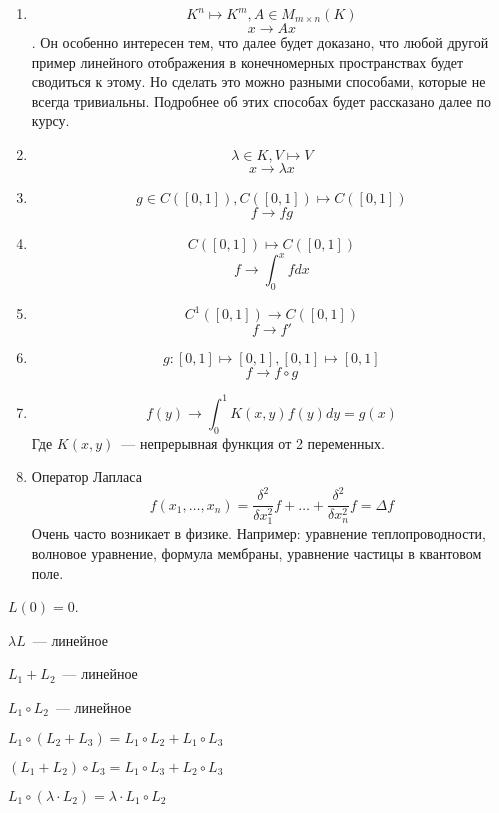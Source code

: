 \begin{examples}
    \begin{enumerate}
        \item $$K^n\mapsto K^m, A\in M_{m\times n}(K)$$ $$x\rightarrow Ax$$.
            Он особенно интересен тем, что далее будет доказано, что любой другой пример линейного 
            отображения в конечномерных пространствах будет сводиться к этому. Но сделать это
            можно разными способами, которые не всегда тривиальны. Подробнее об этих способах будет 
            рассказано далее по курсу.
        \item $$
            \lambda\in K, V\mapsto V
            $$ $$
            x\rightarrow \lambda x $$
        \item $$
            g\in C\left([0, 1]\right), C\left([0,1]\right)\mapsto C\left([0,1]\right)
            $$ $$
            f \rightarrow fg $$
        \item $$
            C\left([0,1]\right)\mapsto C\left([0,1]\right)
            $$ $$
            f\rightarrow \int_0^x f dx$$
        \item
            $$C^1\left([0,1]\right)\rightarrow C\left([0,1]\right)$$
            $$f\rightarrow f'$$
        \item $$
            g: [0, 1]\mapsto [0, 1], [0,1]\mapsto [0,1]
            $$ $$
            f \rightarrow f\circ g $$
        \item
            $$
            f(y)\rightarrow \int_0^1K(x,y)f(y)dy = g(x)
            $$
            Где $K(x,y)$~--- непрерывная функция от 2 переменных.
        \item
            Оператор Лапласа
            $$
            f(x_1,\dots,x_n) = \frac{\delta^2}{\delta x_1^2}f + \dots + \frac{\delta^2}{\delta x_n^2}f=\Delta f
            $$
            Очень часто возникает в физике. Например: уравнение теплопроводности, волновое уравнение,
            формула мембраны, уравнение частицы в квантовом поле.
    \end{enumerate}
\end{examples}
\begin{properties}
\item $L(0) = 0$.
\item $\lambda L$~--- линейное
\item $L_1 + L_2$~--- линейное
\item $L_1\circ L_2$~--- линейное
\item $L_1\circ(L_2 + L_3) = L_1 \circ L_2 + L_1 \circ L_3$
\item $(L_1 + L_2) \circ L_3 = L_1 \circ L_3 + L_2 \circ L_3$
\item $L_1 \circ (\lambda\cdot L_2) = \lambda\cdot L_1 \circ L_2$
\end{properties}

